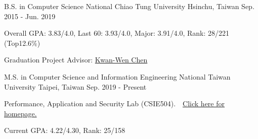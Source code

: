 

\begin{cventries}

\cventry
    {B.S. in Computer Science} %
    {National Chiao Tung University} %
    {Hsinchu, Taiwan} %
    {Sep. 2015 - Jun. 2019} %
    {
      \begin{cvitems} %
        \item {Overall GPA: 3.83/4.0, Last 60: 3.93/4.0, Major: 3.91/4.0, Rank: 28/221 (Top12.6\%)}
        \item {Graduation Project Advisor: \href{https://www.cs.nctu.edu.tw/members/detail/kuanwen}{Kwan-Wen Chen}}
      \end{cvitems}
    }
    
\cventry
    {M.S. in Computer Science and Information Engineering} %
    {National Taiwan University} %
    {Taipei, Taiwan} %
    {Sep. 2019 - Present} %
    {
      \begin{cvitems} %
        \item Performance, Application and Security Lab (CSIE504).\ \    \href{https://hungsh-ntucsie.blogspot.com/p/blog-page_2668.html}{Click here for homepage.}
        \item {Current GPA: 4.22/4.30, Rank: 25/158}
      \end{cvitems}
    }
\end{cventries}
